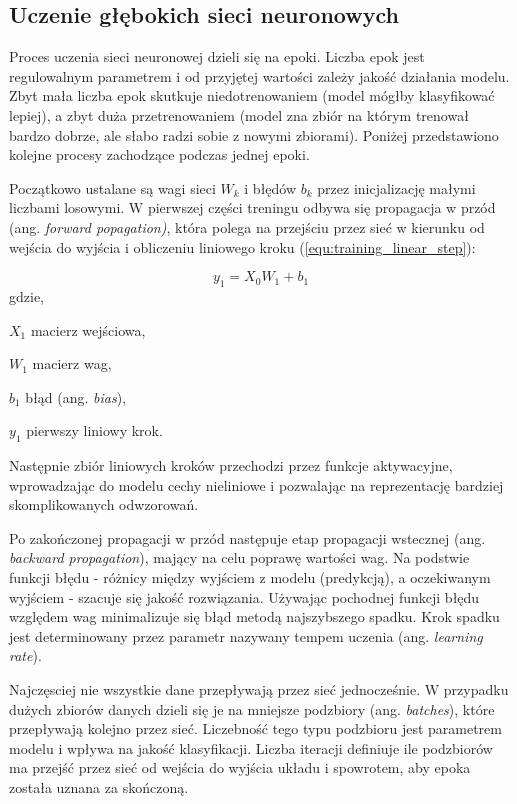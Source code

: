 \subsection{Uczenie głębokich sieci neuronowych}
Proces uczenia sieci neuronowej dzieli się na epoki. Liczba epok jest regulowalnym parametrem i od przyjętej wartości zależy jakość działania modelu. Zbyt mała liczba epok skutkuje niedotrenowaniem (model mógłby klasyfikować lepiej), a zbyt duża przetrenowaniem (model zna zbiór na którym trenował bardzo dobrze, ale słabo radzi sobie z nowymi zbiorami). Poniżej przedstawiono kolejne procesy zachodzące podczas jednej epoki.

{\parindent0pt %
Początkowo ustalane są wagi sieci $W_k$ i błędów $b_k$ przez inicjalizację małymi liczbami losowymi. W pierwszej części treningu odbywa się propagacja w przód (ang. \textit{forward popagation)}, która polega na przejściu przez sieć w kierunku od wejścia do wyjścia i obliczeniu liniowego kroku (\ref{equ:training_linear_step}):

\begin{equation}
y_1 = X_0 W_1 + b_1
\label{equ:training_linear_step}
\end{equation}
gdzie,
\begin{eqwhere}[2cm]
	\item[$X_1$] macierz wejściowa,
	\item[$W_1$] macierz wag,
	\item[$b_1$] błąd (ang. \textit{bias}),
	\item[$y_1$] pierwszy liniowy krok.
\end{eqwhere}

Następnie zbiór liniowych kroków przechodzi przez funkcje aktywacyjne, wprowadzając do modelu cechy nieliniowe i pozwalając na reprezentację bardziej skomplikowanych odwzorowań.

Po zakończonej propagacji w przód następuje etap propagacji wstecznej (ang. \textit{backward propagation}), mający na celu poprawę wartości wag. Na podstwie funkcji błędu - różnicy między wyjściem z modelu (predykcją), a oczekiwanym wyjściem - szacuje się jakość rozwiązania. Używając pochodnej funkcji błędu względem wag minimalizuje się błąd metodą najszybszego spadku. Krok spadku jest determinowany przez parametr nazywany tempem uczenia (ang. \textit{learning rate}). 

Najczęsciej nie wszystkie dane przepływają przez sieć jednocześnie. W przypadku dużych zbiorów danych dzieli się je na mniejsze podzbiory (ang. \textit{batches}), które przepływają kolejno przez sieć. Liczebność tego typu podzbioru jest parametrem modelu i wpływa na jakość klasyfikacji. Liczba iteracji definiuje ile podzbiorów ma przejść przez sieć od wejścia do wyjścia układu i spowrotem, aby epoka została uznana za skończoną. 
}

